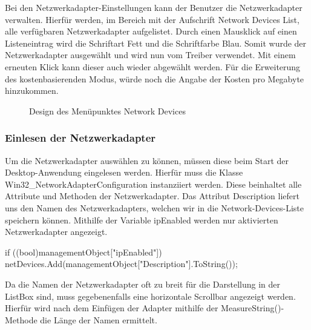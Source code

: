 Bei den Netzwerkadapter-Einstellungen kann der Benutzer die Netzwerkadapter verwalten. Hierfür werden, im Bereich mit der Aufschrift Network Devices List, alle verfügbaren Netzwerkadapter aufgelistet. Durch einen Mausklick auf einen Listeneintrag wird die Schriftart Fett und die Schriftfarbe Blau. Somit wurde der Netzwerkadapter ausgewählt und wird nun vom Treiber verwendet. Mit einem erneuten Klick kann dieser auch wieder abgewählt werden. Für die Erweiterung des kostenbasierenden Modus, würde noch die Angabe der Kosten pro Megabyte hinzukommen.
\\
\begin{figure}[H]
    \centering
    \setlength{\fboxsep}{1pt}
	\setlength{\fboxrule}{1pt}
    \caption{Design des Menüpunktes Network Devices} 
\end{figure}

\subsubsection{Einlesen der Netzwerkadapter}

Um die Netzwerkadapter auswählen zu können, müssen diese beim Start der Desktop-Anwendung eingelesen werden. Hierfür muss die Klasse Win32\_NetworkAdapterConfiguration instanziiert werden. Diese beinhaltet alle Attribute und Methoden der Netzwerkadapter. Das Attribut Description liefert uns den Namen des Netzwerkadapters, welchen wir in die Network-Devices-Liste speichern können. Mithilfe der Variable ipEnabled werden nur aktivierten Netzwerkadapter angezeigt.

\begin{program}[H]
\begin{CSharpCode}
if ((bool)managementObject["ipEnabled"])
{
    netDevices.Add(managementObject["Description"].ToString());
}
\end{CSharpCode}
\caption{Einlesen der Namen der aktiven Netzwerkadapter}
\end{program}
\noindent
Da die Namen der Netzwerkadapter oft zu breit für die Darstellung in der ListBox sind, muss gegebenenfalls eine horizontale Scrollbar angezeigt werden. Hierfür wird nach dem Einfügen der Adapter mithilfe der MeasureString()-Methode die Länge der Namen ermittelt.

\lstset{basicstyle=\footnotesize}

\pagebreak

